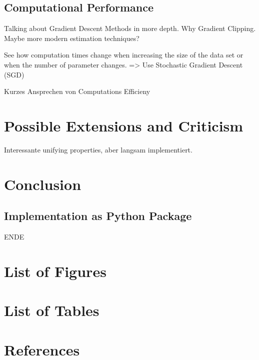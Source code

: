 \documentclass[12pt,a4paper]{article}
\newenvironment{lightbluebox}{%
    \begin{tcolorbox}[colback=lightblue, colframe=lightblue, fontupper=\itshape]%
}{%
    \end{tcolorbox}%
}
\begin{document}
\subsection{Computational Performance}
Talking about Gradient Descent Methods in more depth. Why Gradient Clipping. Maybe more modern estimation techniques? 

See how computation times change when increasing the size of the data set or when the number of parameter changes. => Use Stochastic Gradient Descent (SGD)

\begin{lightbluebox}
Kurzes Ansprechen von Computations Efficieny
\end{lightbluebox}


\section{Possible Extensions and Criticism}


\begin{lightbluebox}
Interessante unifying properties, aber langsam implementiert. 
\end{lightbluebox}
\section{Conclusion}
\subsection{Implementation as Python Package}
\begin{lightbluebox}
ENDE
\end{lightbluebox}
\newpage
\section{List of Figures}
\listoffigures

\newpage
\section{List of Tables}
\listoftables

\newpage
\section{References}

\setcounter{page}{\thesavepage}
\pagestyle{plain}
%
%
\printbibliography[]
\clearpage
\appendix
\end{document}
